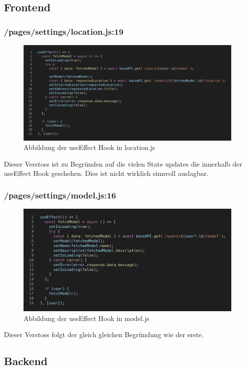 \subsection{Frontend}
\subsubsection{/pages/settings/location.js:19}
\begin{figure}[H]
  \centering
  \includegraphics[width=.95\linewidth]{./images/verstoss-1.png}
  \caption[{Abbildung der useEffect Hook in location.js}]{Abbildung der useEffect Hook in location.js}
\end{figure}
Dieser Verstoss ist zu Begründen auf die vielen State updates die innerhalb der useEffect Hook geschehen. Dies ist nicht wirklich sinnvoll auslagbar.
\subsubsection{/pages/settings/model.js:16}
\begin{figure}[H]
  \centering
  \includegraphics[width=.95\linewidth]{./images/verstoss-2.png}
  \caption[{Abbildung der useEffect Hook in model.js}]{Abbildung der useEffect Hook in model.js}
\end{figure}
Dieser Verstoss folgt der gleich gleichen Begründung wie der erste.
\subsection{Backend}
